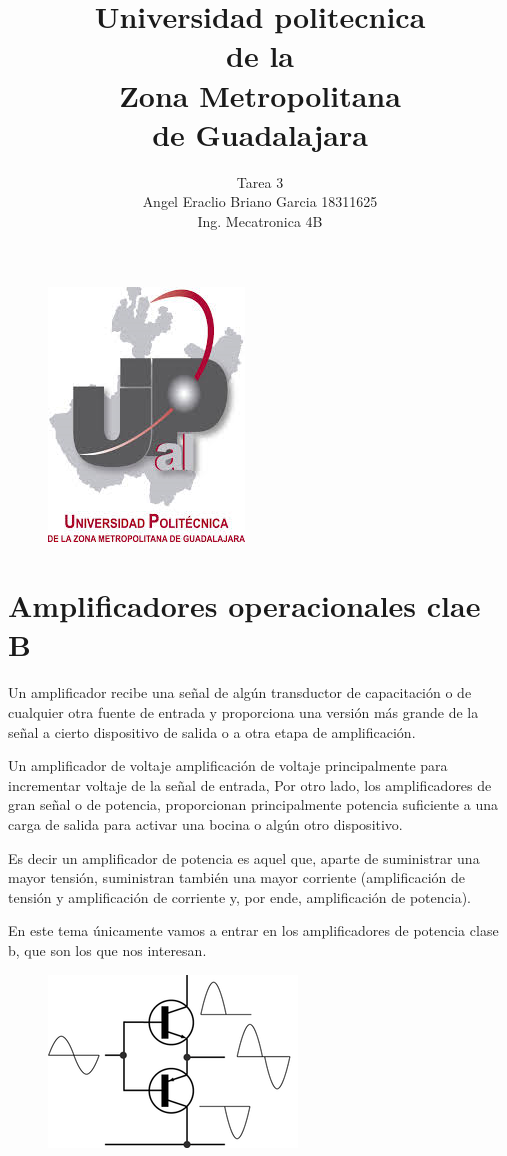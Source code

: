 \documentclass[12pt,a4paper]{article}
\begin{document}
\title{Universidad politecnica\\ de la \\ Zona Metropolitana\\ de Guadalajara}
\author{Tarea 3\\ Angel Eraclio Briano Garcia 18311625\\ Ing. Mecatronica 4B}
\maketitle
\begin{figure}[h!]
\centering
\includegraphics[scale=1]{untitled.png}  
\end{figure}
\newpage
\section{Amplificadores operacionales clae 
B}
Un amplificador recibe una señal de algún transductor de capacitación o de cualquier otra fuente de entrada y proporciona una versión más grande de la señal a cierto dispositivo de salida o a otra etapa de amplificación.

Un amplificador de voltaje amplificación de voltaje principalmente para incrementar voltaje de la señal de entrada, Por otro lado, los amplificadores de gran señal o de potencia, proporcionan principalmente potencia suficiente a una carga de salida para activar una bocina o algún otro dispositivo.

Es decir un amplificador de potencia es aquel que, aparte de suministrar una mayor tensión, suministran también una mayor corriente (amplificación de tensión y amplificación de corriente y, por ende, amplificación de potencia).

En este tema únicamente vamos a entrar en los amplificadores de potencia clase b, que son los que nos interesan.
\begin{figure}[h!]
\centering
\includegraphics[scale=1]{250px-Electronic_Amplifier_Push-pull.png} 
\end{figure}
\end{document}
